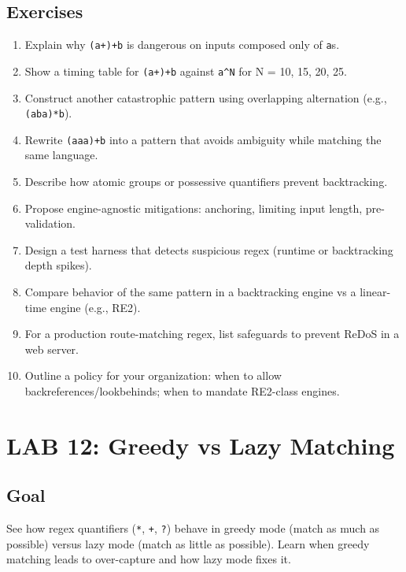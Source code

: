\documentclass[
  letterpaper,
  DIV=11,
  numbers=noendperiod]{scrreprt}
\providecommand{\tightlist}{%
  \setlength{\itemsep}{0pt}\setlength{\parskip}{0pt}}
\begin{document}
\subsection{Exercises}\label{exercises-54}

\begin{enumerate}
\def\labelenumi{\arabic{enumi}.}
\tightlist
\item
  Explain why \texttt{(a+)+b} is dangerous on inputs composed only of
  \texttt{a}s.
\item
  Show a timing table for \texttt{(a+)+b} against \texttt{a\^{}N} for N
  = 10, 15, 20, 25.
\item
  Construct another catastrophic pattern using overlapping alternation
  (e.g., \texttt{(ab\textbar{}a)*b}).
\item
  Rewrite \texttt{(a\textbar{}aa)+b} into a pattern that avoids
  ambiguity while matching the same language.
\item
  Describe how atomic groups or possessive quantifiers prevent
  backtracking.
\item
  Propose engine-agnostic mitigations: anchoring, limiting input length,
  pre-validation.
\item
  Design a test harness that detects suspicious regex (runtime or
  backtracking depth spikes).
\item
  Compare behavior of the same pattern in a backtracking engine vs a
  linear-time engine (e.g., RE2).
\item
  For a production route-matching regex, list safeguards to prevent
  ReDoS in a web server.
\item
  Outline a policy for your organization: when to allow
  backreferences/lookbehinds; when to mandate RE2-class engines.
\end{enumerate}

\section{LAB 12: Greedy vs Lazy
Matching}\label{lab-12-greedy-vs-lazy-matching}

\subsection{Goal}\label{goal-11}

See how regex quantifiers (\texttt{*}, \texttt{+}, \texttt{?}) behave in
greedy mode (match as much as possible) versus lazy mode (match as
little as possible). Learn when greedy matching leads to over-capture
and how lazy mode fixes it.
\end{document}
